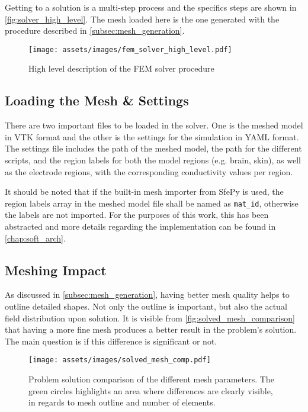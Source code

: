 Getting to a solution is a multi-step process and the specifics steps are shown in \autoref{fig:solver_high_level}. The mesh loaded here is the one generated with the procedure described in \ref{subsec:mesh_generation}.

\begin{figure}[H]
    \centering
    \texttt{[image: assets/images/fem\_solver\_high\_level.pdf]}
    \caption{High level description of the \gls{FEM} solver procedure}
    \label{fig:solver_high_level}
\end{figure}

\subsection{Loading the Mesh \& Settings}

There are two important files to be loaded in the solver. One is the meshed model in \gls{VTK} format and the other is the settings for the simulation in \gls{YAML} format. The settings file includes the path of the meshed model, the path for the different scripts, and the region labels for both the model regions (e.g. brain, skin), as well as the electrode regions, with the corresponding conductivity values per region.

It should be noted that if the built-in mesh importer from SfePy is used, the region labels array in the meshed model file shall be named as \texttt{mat\_id}, otherwise the labels are not imported. For the purposes of this work, this has been abstracted and more details regarding the implementation can be found in \autoref{chap:soft_arch}.

\subsection{Meshing Impact}
\label{sec:mesh_quality}

As discussed in \ref{subsec:mesh_generation}, having better mesh quality helps to outline detailed shapes. Not only the outline is important, but also the actual field distribution upon solution. It is visible from \autoref{fig:solved_mesh_comparison} that having a more fine mesh produces a better result in the problem's solution. The main question is if this difference is significant or not.

\begin{figure}[H]
    \centering
    \texttt{[image: assets/images/solved\_mesh\_comp.pdf]}
    \caption[Problem solution comparison for the different $q$ mesh parameters.]{Problem solution comparison of the different mesh parameters. The green circles highlights an area where differences are clearly visible, in regards to mesh outline and number of elements.}
    \label{fig:solved_mesh_comparison}
\end{figure}

